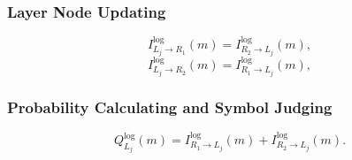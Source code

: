 \documentclass[journal,twoside]{IEEEtran}
\begin{document}
\subsubsection{Layer Node Updating}
\begin{equation}
\label{eqn:log5}
I_{L_{j}\rightarrow R_{1}}^{\log}(m) = I_{R_{2}\rightarrow L_{j}}^{\log}(m),
\end{equation}
\begin{equation}
\label{eqn:log6}
I_{L_{j}\rightarrow R_{2}}^{\log}(m) = I_{R_{1}\rightarrow L_{j}}^{\log}(m),
\end{equation}
\subsubsection{Probability Calculating and Symbol Judging}
\begin{equation}
\label{eqn:81}
Q_{L_{j}}^{\log}(m) = I_{R_{1}\rightarrow L_{j}}^{\log}(m) + I_{R_{2}\rightarrow L_{j}}^{\log}(m).
\end{equation}
\end{document}
